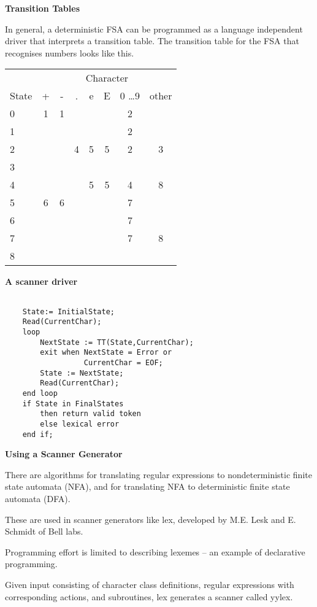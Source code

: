 %
%

\begin{slide}{}
{\bf Transition Tables}

In general, a deterministic FSA can be programmed as a language
independent driver that interprets a transition table.
The transition table for the FSA that recognises numbers
looks like this.

\begin{tabular}{|l||c|c|c|c|c|c|c|}\hline
& \multicolumn{7}{c|}{Character}\\ \cline{2-8}
State & + & - & . & e & E & 0 \ldots 9 & other \\
\hline
0 & 1 & 1 & & & & 2 & \\
1 & & & & & & 2 & \\
2 & & & 4 & 5 & 5 & 2 & 3\\
3 & & & & & & & \\
4 & & & & 5 & 5 & 4 & 8 \\
5 & 6 & 6 & & & & 7 & \\
6 & & & & & & 7 & \\
7 & & & & & & 7 & 8 \\
8 & & & & & & & \\
\hline
\end{tabular}

\end{slide}
%
%
\begin{slide}{}
{\bf A scanner driver}

\begin{verbatim}

    State:= InitialState;
    Read(CurrentChar);
    loop
        NextState := TT(State,CurrentChar);
        exit when NextState = Error or
                  CurrentChar = EOF;
        State := NextState;
        Read(CurrentChar);
    end loop
    if State in FinalStates
        then return valid token
        else lexical error
    end if;

\end{verbatim}
\end{slide}
%
%
\begin{slide}{}
{\small
{\bf Using a Scanner Generator}

There are algorithms for translating regular expressions 
to nondeterministic
finite state automata (NFA), and for translating NFA 
to deterministic finite state automata (DFA).

These are used in scanner generators like lex, developed by
M.E. Lesk and E. Schmidt of Bell labs.

\vspace{3ex}

Programming effort is limited to describing
lexemes -- an example of declarative programming.

Given input consisting of character class definitions,
regular expressions with corresponding actions, and
subroutines, 
lex generates a scanner called yylex.
}
\end{slide}

